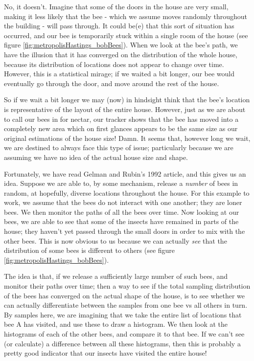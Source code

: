 \documentclass[11pt,fullpage]{book}
\begin{document}
No, it doesn't. Imagine that some of the doors in the house are very small, making it less likely that the bee - which we assume moves randomly throughout the building - will pass through. It could be(e) that this sort of situation has occurred, and our bee is temporarily stuck within a single room of the house (see figure \ref{fig:metropolisHastings_bobBees}). When we look at the bee's path, we have the illusion that it has converged on the distribution of the whole house, because its distribution of locations does not appear to change over time. However, this is a statistical mirage; if we waited a bit longer, our bee would eventually go through the door, and move around the rest of the house.

So if we wait a bit longer we may (now) in hindsight think that the bee's location is representative of the layout of the entire house. However, just as we are about to call our bees in for nectar, our tracker shows that the bee has moved into a completely new area which on first glances appears to be the same size as our original estimations of the house size! Damn. It seems that, however long we wait, we are destined to always face this type of issue; particularly because we are assuming we have no idea of the actual house size and shape.

Fortunately, we have read Gelman and Rubin's 1992 article, and this gives us an idea. Suppose we are able to, by some mechanism, release a \textit{number} of bees in random, at hopefully, diverse locations throughout the house. For this example to work, we assume that the bees do not interact with one another; they are loner bees. We then monitor the paths of all the bees over time. Now looking at our bees, we are able to see that some of the insects have remained in parts of the house; they haven't yet passed through the small doors in order to mix with the other bees. This is now obvious to us because we can actually \textit{see} that the distribution of some bees is different to others (see figure \ref{fig:metropolisHastings_bobBees}).

The idea is that, if we release a sufficiently large number of such bees, and monitor their paths over time; then a way to see if the total sampling distribution of the bees has converged on the actual shape of the house, is to see whether we can actually differentiate between the samples from one bee vs all others in turn. By samples here, we are imagining that we take the entire list of locations that bee A has visited, and use these to draw a histogram. We then look at the histograms of each of the other bees, and compare it to that bee. If we can't see (or calculate) a difference between all these histograms, then this is probably a pretty good indicator that our insects have visited the entire house!
\end{document}
